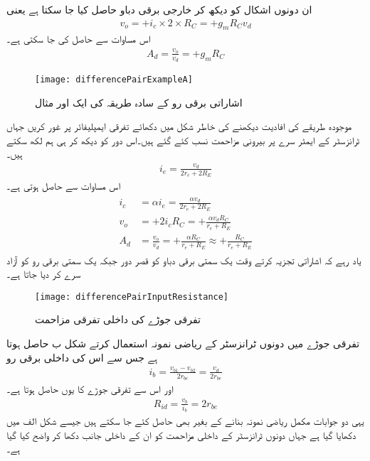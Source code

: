 ان دونوں اشکال کو دیکھ کر خارجی برقی دباو حاصل کیا جا سکتا ہے یعنی
\begin{align}
v_o=+i_c \times 2 \times R_C=+g_m R_C v_d
\end{align}
اس مساوات سے    حاصل کی جا سکتی ہے۔
\begin{align}
A_d=\frac{v_o}{v_d}=+g_m R_C
\end{align}
%
\begin{figure}
\centering
\texttt{[image: differencePairExampleA]}
\caption{ اشاراتی برقی رو کے سادہ طریقہ کی ایک اور مثال}
\label{شکل_اشاراتی_برقی_رو_کے_سادہ_طریقے_کی_ایک_اور_مثال}
\end{figure}
موجودہ طریقے کی افادیت دیکھنے کی خاطر شکل   میں دکھائے تفرقی ایمپلیفائر پر غور کریں جہاں ٹرانزسٹر کے ایمٹر سرے پر بیرونی مزاحمت  نسب کئے گئے ہیں۔اس دور کو دیکھ کر ہی ہم لکھ سکتے ہیں۔
\begin{align*}
i_e=\frac{v_d}{2 r_e +2 R_E}
\end{align*}
اس مساوات سے  حاصل ہوتی ہے۔
\begin{gather}
\begin{aligned}
i_c&= \alpha i_e =\frac{\alpha v_d}{2 r_e + 2 R_E}\\
v_o&=+2 i_c R_C=+\frac{\alpha v_d R_C}{r_e+ R_E}\\
A_d&=\frac{v_o}{v_d}=+\frac{\alpha R_C}{r_e+R_E} \approx +\frac{R_C}{r_e+R_E}
\end{aligned}
\end{gather}
یاد رہے کہ اشاراتی تجزیہ کرتے وقت یک سمتی برقی دباو کو قصر دور جبکہ یک سمتی برقی رو کو آزاد  سرے کر دیا جاتا ہے۔ 



\begin{figure}
\centering
\texttt{[image: differencePairInputResistance]}
\caption{تفرقی جوڑے کی داخلی تفرقی مزاحمت}
\label{شکل_تفرقی_جوڑے_کی_داخلی_مزاحمت}
\end{figure}
تفرقی جوڑے میں دونوں ٹرانزسٹر کے   ریاضی نمونہ استعمال کرتے شکل  ب حاصل ہوتا ہے جس سے اس کی داخلی برقی رو  
\begin{align}
i_b=\frac{v_{b1}-v_{b2}}{2 r_{be}}=\frac{v_d}{2 r_{be}}
\end{align}
اور اس سے تفرقی جوڑے کا   یوں حاصل ہوتا ہے۔
\begin{align}
R_{id}=\frac{v_b}{i_b}=2 r_{be}
\end{align}
یہی دو جوابات مکمل ریاضی نمونہ بنانے کے بغیر بھی حاصل کئے جا سکتے ہیں جیسے شکل  الف میں دکھایا گیا ہے جہاں دونوں ٹرانزسٹر کے داخلی مزاحمت   کو  ان کے داخلی جانب دکھا کر واضح کیا گیا ہے۔

